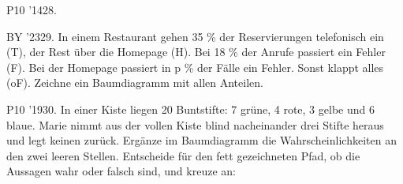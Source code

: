 \documentclass[11pt]{article}
\begin{document}
\begin{pfaufg}{P10 ’14}{28.}{}
\end{pfaufg}
\begin{pfaufg}{BY ’23}{29.}{}
In einem Restaurant gehen 35 \% der Reservierungen telefonisch ein (T), der Rest über die Homepage (H). Bei 18 \% der Anrufe passiert ein Fehler (F). Bei der Homepage passiert in p \% der Fälle ein Fehler. Sonst klappt alles (oF). Zeichne ein Baumdiagramm mit allen Anteilen.
\end{pfaufg}
\pfgruppe{}
\begin{pfaufg}{P10 ’19}{\llap{\textasteriskcentered\,}30.}{}
In einer Kiste liegen 20 Buntstifte: 7 grüne, 4 rote, 3 gelbe und 6 blaue. Marie nimmt aus der vollen Kiste blind nacheinander drei Stifte heraus und legt keinen zurück. Ergänze im Baumdiagramm die Wahrscheinlichkeiten an den zwei leeren Stellen. Entscheide für den fett gezeichneten Pfad, ob die Aussagen wahr oder falsch sind, und kreuze an:

\end{pfaufg}
\end{document}
